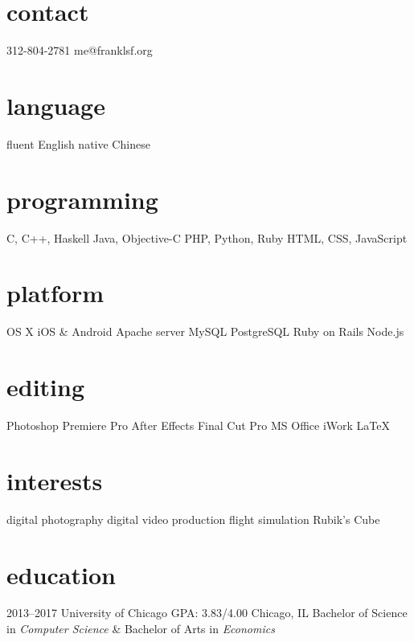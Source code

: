 \documentclass[]{friggeri-cv} %
\begin{document}


\begin{aside} %
\section{contact}
312-804-2781
me@franklsf.org
\section{language}
fluent English
native Chinese
\section{programming}
C, C++, Haskell
Java, Objective-C
PHP, Python, Ruby
HTML, CSS, JavaScript
\section{platform}
OS X
iOS \& Android
Apache server
MySQL
PostgreSQL
Ruby on Rails
Node.js
\section{editing}
Photoshop
Premiere Pro
After Effects
Final Cut Pro
MS Office
iWork
{\LaTeX}
\section{interests}
digital photography
digital video production
flight simulation
Rubik’s Cube
\end{aside}


\section{education}

\begin{entrylist}
\entry
{2013--2017}
{University of Chicago}
{GPA: 3.83/4.00\hspace{4em} Chicago, IL}
{Bachelor of Science in \emph{Computer Science} \& Bachelor of Arts in \emph{Economics}}
\end{entrylist}
\end{document}
